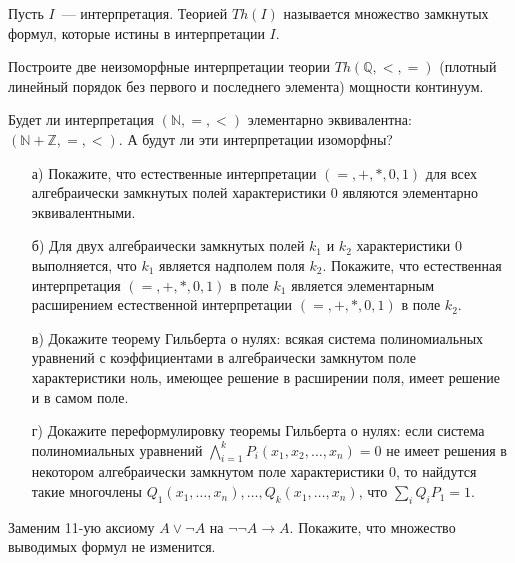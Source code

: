 Пусть $I$~--- интерпретация. Теорией $Th(I)$ называется множество замкнутых формул, которые истины в интерпретации $I$.

\begin{task}
    Построите две неизоморфные интерпретации теории $Th(\mathbb{Q}, <, =)$ (плотный линейный порядок без первого и последнего
    элемента) мощности континуум.
\end{task}


\breakline

\begin{ptask}{51}
    Будет ли интерпретация $(\mathbb{N}, =, <)$ элементарно эквивалентна: $(\mathbb{N} + \mathbb{Z}, =, <)$. А будут ли эти
    интерпретации изоморфны?
\end{ptask}

\begin{ptask}{53}
    \begin{enumerate}[topsep = 0pt, itemsep = -1ex]
        \item [а)] Покажите, что естественные интерпретации $(=, +, *, 0, 1)$ для всех алгебраически замкнутых полей
			характеристики $0$ являются элементарно эквивалентными.
        \item [б)] Для двух алгебраически замкнутых полей $k_1$ и $k_2$ характеристики $0$ выполняется, что $k_1$ является
		    надполем поля $k_2$. Покажите, что естественная интерпретация $(=, +, *, 0, 1)$ в поле $k_1$ является элементарным
            расширением естественной интерпретации $(=, +, *, 0, 1)$ в поле $k_2$.
        \item [в)] Докажите теорему Гильберта о нулях: всякая система полиномиальных уравнений с коэффициентами в алгебраически
			замкнутом поле характеристики ноль, имеющее решение в расширении поля, имеет решение и в самом поле.
        \item [г)] Докажите переформулировку теоремы Гильберта о нулях: если система полиномиальных уравнений
        	$\bigwedge\limits_{i = 1}^k P_i(x_1, x_2, \dots, x_n) = 0$ не имеет решения в некотором алгебраически замкнутом поле
            характеристики $0$, то найдутся такие многочлены $Q_1(x_1, \dots, x_n), \dots, Q_k(x_1, \dots, x_n)$, что
            $\sum\limits_i Q_i P_1 = 1$.
    \end{enumerate}
\end{ptask}

\begin{ptask}{58}
	Заменим 11-ую аксиому $A \lor \lnot A$ на $\lnot \lnot A \to A$. Покажите, что множество выводимых формул не изменится.
\end{ptask}

